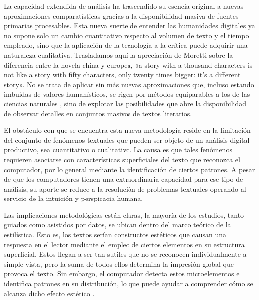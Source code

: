 La capacidad extendida de análisis ha trascendido su esencia original a nuevas aproximaciones comparatísticas gracias a la disponibilidad masiva de fuentes primarias procesables. Esta nueva suerte de entender las humanidades digitales ya no supone solo un cambio cuantitativo respecto al volumen de texto y el tiempo empleado, sino que la aplicación de la tecnología a la crítica puede adquirir una naturaleza cualitativa. Trasladamos aquí la apreciación de Moretti \parencite*[117]{moretti2008} sobre la diferencia entre la novela china y europea, «a story with a thousand characters is not like a story with fifty characters, only twenty times bigger: it's a different story». No se trata de aplicar sin más nuevas aproximaciones que, incluso estando imbuidas de valores humanísticos, se rigen por métodos equiparables a los de las ciencias naturales \parencite[xxix]{potter1989}, sino de explotar las posibilidades que abre la disponibilidad de observar detalles en conjuntos masivos de textos literarios.
 
El obstáculo con que se encuentra esta nueva metodología reside en la limitación del conjunto de fenómenos textuales que pueden ser objeto de un análisis digital productivo, sea cuantitativo o cualitativo. La causa es que tales fenómenos requieren asociarse con características superficiales del texto que reconozca el computador, por lo general mediante la identificación de ciertos patrones. A pesar de que los computadores tienen una extraordinaria capacidad para ese tipo de análisis, su aporte se reduce a la resolución de problemas textuales operando al servicio de la intuición y perspicacia humana.

Las implicaciones metodológicas están claras, la mayoría de los estudios, tanto guiados como asistidos por datos, se ubican dentro del marco teórico de la estilística. Esto es, los textos serían constructos estéticos que causan una respuesta en el lector mediante el empleo de ciertos elementos en su estructura superficial. Estos llegan a ser tan sutiles que no se reconocen individualmente a simple vista, pero la suma de todos ellos determina la impresión global que provoca el texto. Sin embargo, el computador detecta estos microelementos e identifica patrones en su distribución, lo que puede ayudar a comprender cómo se alcanza dicho efecto estético \parencite[89-90]{rommel2004}.

